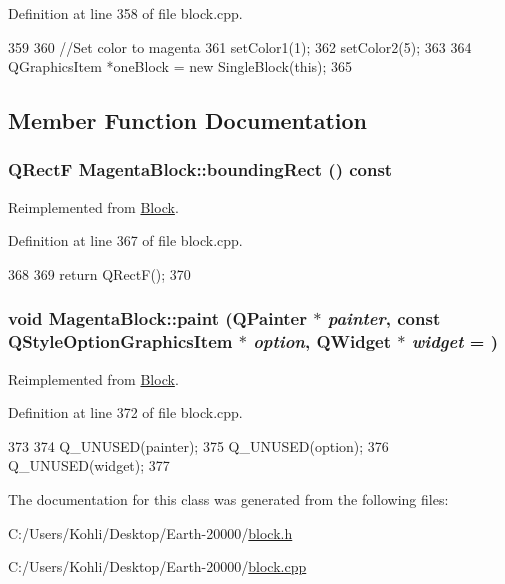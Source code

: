Definition at line 358 of file block.cpp.


\begin{DoxyCode}
359 {
360     //Set color to magenta
361     setColor1(1);
362     setColor2(5);
363 
364     QGraphicsItem *oneBlock = new SingleBlock(this);
365 }
\end{DoxyCode}


\subsection{Member Function Documentation}
\hypertarget{class_magenta_block_aec892d6118a5a5030d767a5ccfc56929}{
\subsubsection[{boundingRect}]{\setlength{\rightskip}{0pt plus 5cm}QRectF MagentaBlock::boundingRect () const}}
\label{class_magenta_block_aec892d6118a5a5030d767a5ccfc56929}


Reimplemented from \hyperlink{class_block_aee4444b92a82f5a8080e9019ef1e554d}{Block}.

Definition at line 367 of file block.cpp.


\begin{DoxyCode}
368 {
369     return QRectF();
370 }
\end{DoxyCode}
\hypertarget{class_magenta_block_ac48f5303ee031233918abfa460dd7066}{
\subsubsection[{paint}]{\setlength{\rightskip}{0pt plus 5cm}void MagentaBlock::paint (QPainter $\ast$ {\em painter}, \/  const QStyleOptionGraphicsItem $\ast$ {\em option}, \/  QWidget $\ast$ {\em widget} = {})}}
\label{class_magenta_block_ac48f5303ee031233918abfa460dd7066}


Reimplemented from \hyperlink{class_block_a36791d086b6fad1a2203bfef6fdbaa0a}{Block}.

Definition at line 372 of file block.cpp.


\begin{DoxyCode}
373 {
374     Q_UNUSED(painter);
375     Q_UNUSED(option);
376     Q_UNUSED(widget);
377 }
\end{DoxyCode}


The documentation for this class was generated from the following files:\begin{DoxyCompactItemize}
\item 
C:/Users/Kohli/Desktop/Earth-\/20000/\hyperlink{block_8h}{block.h}\item 
C:/Users/Kohli/Desktop/Earth-\/20000/\hyperlink{block_8cpp}{block.cpp}\end{DoxyCompactItemize}
